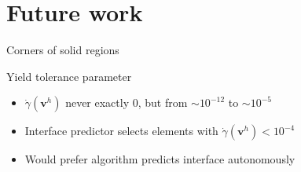 \documentclass{beamer}  %
\newcommand{\vv}{\mathbf{v}}
\begin{document}
\section{Future work}
\begin{frame}{Corners of solid regions}
    \begin{figure}
        \begin{overprint}
        \end{overprint}
    \end{figure}
\end{frame}


\begin{frame}{Yield tolerance parameter}
    \begin{itemize}
        \item $\dot\gamma(\vv^h)$ never exactly $0$, but from $\sim 10^{-12}$ to $\sim 10^{-5}$
        \item Interface predictor selects elements with $\dot\gamma(\vv^h)<10^{-4}$
        \item Would prefer algorithm predicts interface autonomously
    \end{itemize}
\end{frame}
\end{document}
